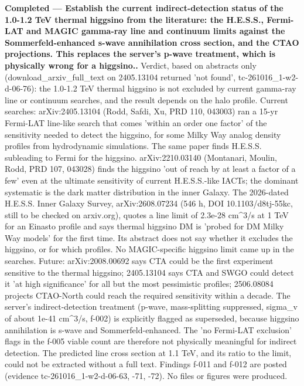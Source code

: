 \documentclass[11pt,a4paper]{article}
\begin{document}
\textbf{Completed --- Establish the current indirect-detection status of the 1.0-1.2 TeV thermal higgsino from the literature: the H.E.S.S., Fermi-LAT and MAGIC gamma-ray line and continuum limits against the Sommerfeld-enhanced s-wave annihilation cross section, and the CTAO projections. This replaces the server's p-wave treatment, which is physically wrong for a higgsino..} Verdict, based on abstracts only (download\_arxiv\_full\_text on 2405.13104 returned 'not found', tc-261016\_1-w2-d-06-76): the 1.0-1.2 TeV thermal higgsino is not excluded by current gamma-ray line or continuum searches, and the result depends on the halo profile. Current searches: arXiv:2405.13104 (Rodd, Safdi, Xu, PRD 110, 043003) ran a 15-yr Fermi-LAT line-like search that comes 'within an order one factor' of the sensitivity needed to detect the higgsino, for some Milky Way analog density profiles from hydrodynamic simulations. The same paper finds H.E.S.S. subleading to Fermi for the higgsino. arXiv:2210.03140 (Montanari, Moulin, Rodd, PRD 107, 043028) finds the higgsino 'out of reach by at least a factor of a few' even at the ultimate sensitivity of current H.E.S.S.-like IACTs; the dominant systematic is the dark matter distribution in the inner Galaxy. The 2026-dated H.E.S.S. Inner Galaxy Survey, arXiv:2608.07234 (546 h, DOI 10.1103/d8tj-55kc, still to be checked on arxiv.org), quotes a line limit of 2.3e-28 cm\textasciicircum{}3/s at 1 TeV for an Einasto profile and says thermal higgsino DM is 'probed for DM Milky Way models' for the first time. Its abstract does not say whether it excludes the higgsino, or for which profiles. No MAGIC-specific higgsino limit came up in the searches. Future: arXiv:2008.00692 says CTA could be the first experiment sensitive to the thermal higgsino; 2405.13104 says CTA and SWGO could detect it 'at high significance' for all but the most pessimistic profiles; 2506.08084 projects CTAO-North could reach the required sensitivity within a decade. The server's indirect-detection treatment (p-wave, mass-splitting suppressed, sigma\_v of about 1e-41 cm\textasciicircum{}3/s, f-002) is explicitly flagged as superseded, because higgsino annihilation is s-wave and Sommerfeld-enhanced. The 'no Fermi-LAT exclusion' flags in the f-005 viable count are therefore not physically meaningful for indirect detection. The predicted line cross section at 1.1 TeV, and its ratio to the limit, could not be extracted without a full text. Findings f-011 and f-012 are posted (evidence tc-261016\_1-w2-d-06-63, -71, -72). No files or figures were produced.
\end{document}
